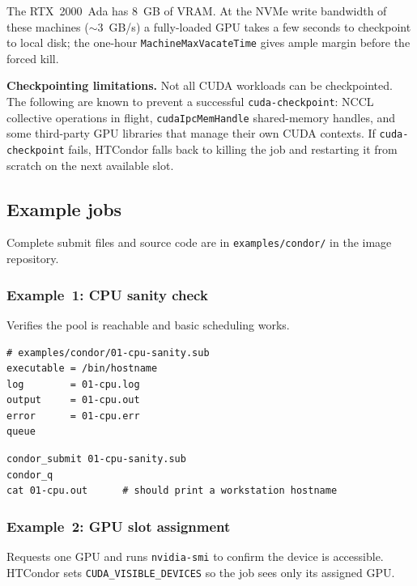 \documentclass[11pt,a4paper]{article}
\newenvironment{keybox}[1]{%
  \begin{mdframed}[backgroundcolor=boxbg,linecolor=boxframe,linewidth=1pt,
    innertopmargin=6pt,innerbottommargin=6pt,
    innerrightmargin=8pt,innerleftmargin=8pt]
  \textbf{#1.}\quad}{\end{mdframed}}
\begin{document}
The RTX~2000~Ada has 8~GB of VRAM.  At the NVMe write bandwidth of these
machines ($\sim$3~GB/s) a fully-loaded GPU takes a few seconds to checkpoint to
local disk; the one-hour \texttt{MachineMaxVacateTime} gives ample margin before
the forced kill.

\begin{keybox}{Checkpointing limitations}
Not all CUDA workloads can be checkpointed.  The following are known to prevent
a successful \texttt{cuda-checkpoint}: NCCL collective operations in flight,
\texttt{cudaIpcMemHandle} shared-memory handles, and some third-party GPU
libraries that manage their own CUDA contexts.  If \texttt{cuda-checkpoint}
fails, HTCondor falls back to killing the job and restarting it from scratch on
the next available slot.
\end{keybox}

\subsection{Example jobs}
\label{sec:examples}

Complete submit files and source code are in \texttt{examples/condor/} in the
image repository.

\subsubsection*{Example~1: CPU sanity check}

Verifies the pool is reachable and basic scheduling works.

\begin{verbatim}
# examples/condor/01-cpu-sanity.sub
executable = /bin/hostname
log        = 01-cpu.log
output     = 01-cpu.out
error      = 01-cpu.err
queue
\end{verbatim}

\begin{verbatim}
condor_submit 01-cpu-sanity.sub
condor_q
cat 01-cpu.out      # should print a workstation hostname
\end{verbatim}

\subsubsection*{Example~2: GPU slot assignment}

Requests one GPU and runs \texttt{nvidia-smi} to confirm the device is
accessible.  HTCondor sets \texttt{CUDA\_VISIBLE\_DEVICES} so the job sees
only its assigned GPU.
\end{document}

